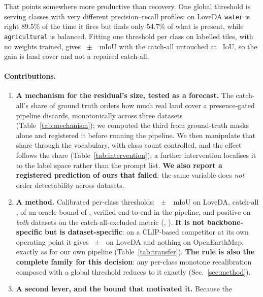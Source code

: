 \documentclass[10pt,a4paper]{article}                        %
\newcommand{\best}[1]{\textbf{#1}}
\begin{document}
That points somewhere more productive than recovery. One global threshold is
serving classes with very different precision--recall profiles: on LoveDA
\texttt{water} is right 89.5\% of the time it fires but finds only
54.7\% of what is present, while \texttt{agricultural} is balanced.
Fitting one threshold per class on \calibTiles{} labelled tiles, with no weights
trained, gives \methodGain{}~$\pm$~\methodSD{}~mIoU with the catch-all untouched
at
\methodBg{}~IoU, so the gain is land cover and not a repaired catch-all.

\paragraph{Contributions.}
\begin{enumerate}\itemsep2pt
  \item \textbf{A mechanism for the residual's size, tested as a forecast.} The
        catch-all's share of ground truth orders how much real land cover a
        presence-gated pipeline discards, monotonically across three datasets
        (Table~\ref{tab:mechanism}); we computed the third from ground-truth masks
        alone and registered it before running the pipeline. We then manipulate
        that share through the vocabulary, with class count controlled, and the
        effect follows the share (Table~\ref{tab:intervention}); a further
        intervention localises it to the label space rather than the prompt list.
        \best{We also report a registered prediction of ours that failed}: the same
        variable does \emph{not} order detectability across datasets.
  \item \textbf{A method.} Calibrated per-class thresholds:
        \methodGain{}~$\pm$~\methodSD{}~mIoU on LoveDA, catch-all \methodBg{},
        \oracleShare{} of an oracle bound of \oracleBound{}, verified end-to-end in
        the pipeline, and positive on \emph{both} datasets on the
        catch-all-excluded metric (\mrLoveReal{}, \mrOemReal{}). \best{It is not
        backbone-specific but is dataset-specific}: on a CLIP-based competitor at
        its own operating point it gives \cnCV{}~$\pm$~\cnCVsd{} on LoveDA and
        nothing on OpenEarthMap, exactly as for our own pipeline
        (Table~\ref{tab:transfer}). \best{The rule is also the complete family for
        this decision}: any per-class monotone recalibration composed with a global
        threshold reduces to it exactly (Sec.~\ref{sec:method}).
  \item \textbf{A second lever, and the bound that motivated it.} Because the

\end{enumerate}
\end{document}
